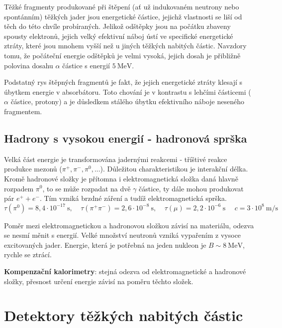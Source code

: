 \documentclass[../../main.tex]{subfiles}
\begin{document}
Těžké fragmenty produkované při štěpení (ať už indukovaném neutrony nebo spontánním) těžkých jader jsou energetické částice, jejichž vlastnosti se liší od těch do této chvíle probíraných. Jelikož odštěpky jsou na počátku zbaveny spousty elektronů, jejich velký efektivní náboj ústí ve specifické energetické ztráty, které jsou mnohem vyšší než u jiných těžkých nabitých částic. Navzdory tomu, že počáteční energie odštěpků je velmi vysoká, jejich dosah je přibližně polovina dosahu $\alpha$ částice s energií $5 ~\mathrm{MeV}$.
	
Podstatný rys štěpných fragmentů je fakt, že jejich energetické ztráty klesají s úbytkem energie v absorbátoru. Toto chování je v kontrastu s lehčími částicemi ($\alpha$ částice, protony) a je důsledkem stálého úbytku efektivního náboje neseného fragmentem.	

\subsection{Hadrony s vysokou energií - hadronová sprška}

Velká část energie je transformována jadernými reakcemi - tříštivé reakce produkce mezonů ($\pi^+ , \pi^- , \pi^0,...$). Důležitou charakteristikou je interakční délka. Kromě hadronové složky je přítomna i elektromagnetická složka daná hlavně rozpadem $\pi^0$, to se může rozpadat na dvě $\gamma$ částice, ty dále mohou produkovat pár $ e^+ + e^-$. Tím vzniká brzdné záření a tudíž elektromagnetická sprška.
\begin{equation}
\tau (\pi^0) = 8,4 \cdotp 10^{-17} ~\mathrm{s}, ~~~~~ \tau (\pi^+ \pi^-) = 2,6 \cdotp 10^{-8} ~\mathrm{s}, ~~~~~ \tau(\mu) = 2,2 \cdotp 10^{-6} ~\mathrm{s} ~~~~~~ c = 3 \cdotp 10^8 ~\mathrm{m/s}
\end{equation}

Poměr mezi elektromagnetickou a hadronovou složkou závisí na materiálu, odezva se nesmí měnit s energií. Velké množství neutronů vzniká vypařením z vysoce excitovaných jader. Energie, která je potřebná na jeden nukleon je $B \sim 8 ~\mathrm{MeV}$, rychle se ztrácí. 

\textbf{Kompenzační kalorimetry}: stejná odezva od elektromagnetické a hadronové složky, přesnost určení energie závisí na poměru těchto složek.


\section{Detektory těžkých nabitých částic}
\end{document}

